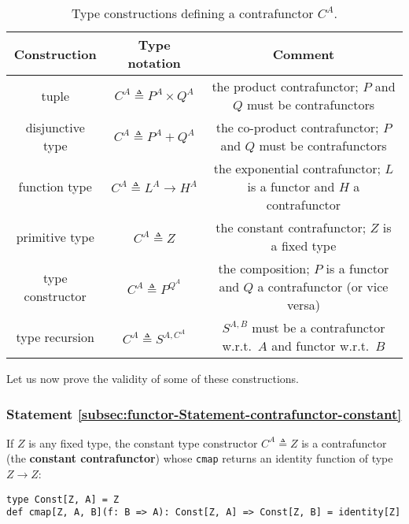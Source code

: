 \begin{table}
\begin{centering}
\begin{tabular}{|c|c|c|}
\hline 
\textbf{\small{}Construction} & \textbf{\small{}Type notation} & \textbf{\small{}Comment}\tabularnewline
\hline 
\hline 
{\footnotesize{}tuple} & {\footnotesize{}$C^{A}\triangleq P^{A}\times Q^{A}$} & {\footnotesize{}the product contrafunctor; $P$ and $Q$ must be contrafunctors}\tabularnewline
\hline 
{\footnotesize{}disjunctive type} & {\footnotesize{}$C^{A}\triangleq P^{A}+Q^{A}$} & {\footnotesize{}the co-product contrafunctor; $P$ and $Q$ must be
contrafunctors}\tabularnewline
\hline 
{\footnotesize{}function type} & {\footnotesize{}$C^{A}\triangleq L^{A}\rightarrow H^{A}$} & {\footnotesize{}the exponential contrafunctor; $L$ is a functor and
$H$ a contrafunctor}\tabularnewline
\hline 
{\footnotesize{}primitive type} & {\footnotesize{}$C^{A}\triangleq Z$} & {\footnotesize{}the constant contrafunctor; $Z$ is a fixed type}\tabularnewline
\hline 
{\footnotesize{}type constructor} & {\footnotesize{}$C^{A}\triangleq P^{Q^{A}}$} & {\footnotesize{}the composition; $P$ is a functor and $Q$ a contrafunctor
(or vice versa)}\tabularnewline
\hline 
{\footnotesize{}type recursion} & {\footnotesize{}$C^{A}\triangleq S^{A,C^{A}}$} & {\footnotesize{}$S^{A,B}$ must be a contrafunctor w.r.t.~$A$ and
functor w.r.t.~$B$}\tabularnewline
\hline 
\end{tabular}
\par\end{centering}
\caption{Type constructions defining a contrafunctor $C^{A}$.\label{tab:f-Contrafunctor-constructions}}
\end{table}

Let us now prove the validity of some of these constructions.

\subsubsection{Statement \label{subsec:functor-Statement-contrafunctor-constant}\ref{subsec:functor-Statement-contrafunctor-constant}}

If $Z$ is any fixed type, the constant type constructor $C^{A}\triangleq Z$
is a contrafunctor (the \textbf{constant contrafunctor})
whose \lstinline!cmap! returns an identity function of type $Z\rightarrow Z$:
\begin{lstlisting}
type Const[Z, A] = Z
def cmap[Z, A, B](f: B => A): Const[Z, A] => Const[Z, B] = identity[Z] 
\end{lstlisting}


